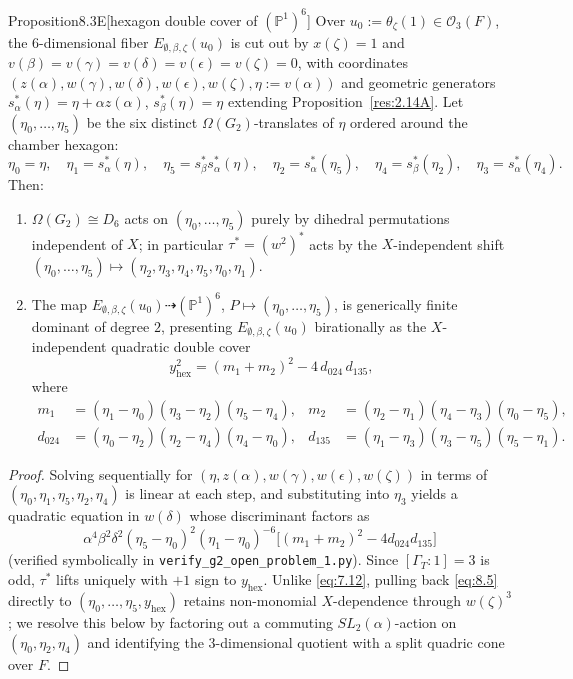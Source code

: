 \documentclass[12pt,letterpaper]{amsart}
\theoremstyle{plain}
\theoremstyle{definition}
\theoremstyle{remark}
\theoremstyle{definition}
\begin{document}
\begin{res}{Proposition}{8.3E}[hexagon double cover of $(\mathbb{P}^1)^6$]\label{res:8.3E}
Over $u_0:=\theta_\zeta(1)\in\mathcal O_3(F)$, the $6$-dimensional fiber
$E_{\emptyset,\beta,\zeta}(u_0)$ is cut out by $x(\zeta)=1$ and
$v(\beta)=v(\gamma)=v(\delta)=v(\epsilon)=v(\zeta)=0$, with coordinates
$(z(\alpha),w(\gamma),w(\delta),w(\epsilon),w(\zeta),\eta:=v(\alpha))$ and
geometric generators $s_\alpha^*(\eta)=\eta+\alpha z(\alpha)$,
$s_\beta^*(\eta)=\eta$ extending Proposition~\ref{res:2.14A}. Let
$(\eta_0,\dots,\eta_5)$ be the six distinct $\Omega(G_2)$-translates of $\eta$
ordered around the chamber hexagon:
\[
\eta_0=\eta,\quad \eta_1=s_\alpha^*(\eta),\quad
\eta_5=s_\beta^*s_\alpha^*(\eta),\quad \eta_2=s_\alpha^*(\eta_5),\quad
\eta_4=s_\beta^*(\eta_2),\quad \eta_3=s_\alpha^*(\eta_4).
\]
Then:
\begin{enumerate}[{\upshape(a)}]
\item $\Omega(G_2)\cong D_6$ acts on $(\eta_0,\dots,\eta_5)$ purely by dihedral
permutations independent of $X$; in particular $\tau^*=(w^2)^*$ acts by the
$X$-independent shift $(\eta_0,\dots,\eta_5)\mapsto(\eta_2,\eta_3,\eta_4,\eta_5,\eta_0,\eta_1)$.
\item The map $E_{\emptyset,\beta,\zeta}(u_0)\dashrightarrow(\mathbb{P}^1)^6$,
$P\mapsto(\eta_0,\dots,\eta_5)$, is generically finite dominant of degree $2$,
presenting $E_{\emptyset,\beta,\zeta}(u_0)$ birationally as the $X$-independent
quadratic double cover
\[
y_{\mathrm{hex}}^2=(m_1+m_2)^2-4\,d_{024}\,d_{135},
\]
where
\begin{align*}
m_1&=(\eta_1-\eta_0)(\eta_3-\eta_2)(\eta_5-\eta_4), &
m_2&=(\eta_2-\eta_1)(\eta_4-\eta_3)(\eta_0-\eta_5),\\
d_{024}&=(\eta_0-\eta_2)(\eta_2-\eta_4)(\eta_4-\eta_0), &
d_{135}&=(\eta_1-\eta_3)(\eta_3-\eta_5)(\eta_5-\eta_1).
\end{align*}
\end{enumerate}
\end{res}

\begin{proof}
Solving sequentially for $(\eta,z(\alpha),w(\gamma),w(\epsilon),w(\zeta))$ in
terms of $(\eta_0,\eta_1,\eta_5,\eta_2,\eta_4)$ is linear at each step, and
substituting into $\eta_3$ yields a quadratic equation in $w(\delta)$ whose
discriminant factors as
\[
\alpha^4\beta^2\delta^2(\eta_5-\eta_0)^2(\eta_1-\eta_0)^{-6}\bigl[(m_1+m_2)^2-4d_{024}d_{135}\bigr]
\]
(verified symbolically in \texttt{verify\_g2\_open\_problem\_1.py}). Since
$[\Gamma_T:1]=3$ is odd, $\tau^*$ lifts uniquely with $+1$ sign to
$y_{\mathrm{hex}}$. Unlike \eqref{eq:7.12}, pulling back \eqref{eq:8.5} directly to
$(\eta_0,\dots,\eta_5,y_{\mathrm{hex}})$ retains non-monomial $X$-dependence
through $w(\zeta)^3$; we resolve this below by factoring out a commuting
$SL_2(\alpha)$-action on $(\eta_0,\eta_2,\eta_4)$ and identifying the
$3$-dimensional quotient with a split quadric cone over $F$.
\end{proof}
\end{document}
